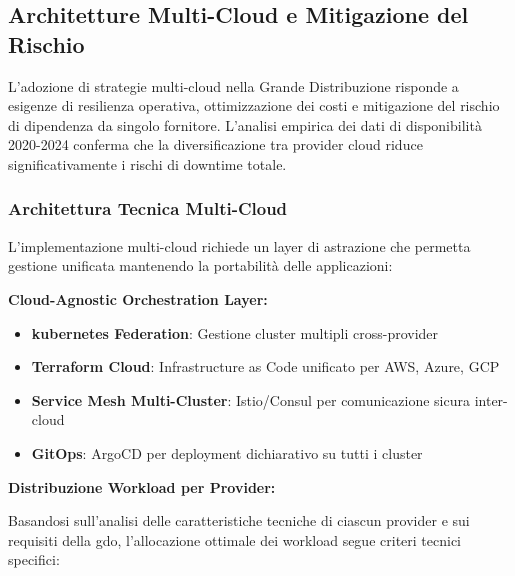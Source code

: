\subsection{\texorpdfstring{Architetture Multi-Cloud e Mitigazione del Rischio}{3.4.2 - Architetture Multi-Cloud e Mitigazione del Rischio}}

L'adozione di strategie multi-cloud nella Grande Distribuzione risponde a esigenze di resilienza operativa, ottimizzazione dei costi e mitigazione del rischio di dipendenza da singolo fornitore. L'analisi empirica dei dati di disponibilità 2020-2024\autocite{Uptime2024} conferma che la diversificazione tra provider cloud riduce significativamente i rischi di downtime totale.

\subsubsection{\texorpdfstring{Architettura Tecnica Multi-Cloud}{3.4.2.1 - Architettura Tecnica Multi-Cloud}}

L'implementazione multi-cloud richiede un layer di astrazione che permetta gestione unificata mantenendo la portabilità delle applicazioni:

\textbf{Cloud-Agnostic Orchestration Layer:}
\begin{itemize}
    \item \textbf{\gls{kubernetes} Federation}: Gestione cluster multipli cross-provider
    \item \textbf{Terraform Cloud}: Infrastructure as Code unificato per AWS, Azure, GCP
    \item \textbf{Service Mesh Multi-Cluster}: Istio/Consul per comunicazione sicura inter-cloud
    \item \textbf{GitOps}: ArgoCD per deployment dichiarativo su tutti i cluster
\end{itemize}

\textbf{Distribuzione Workload per Provider:}

Basandosi sull'analisi delle caratteristiche tecniche di ciascun provider e sui requisiti della \gls{gdo}, l'allocazione ottimale dei workload segue criteri tecnici specifici:

